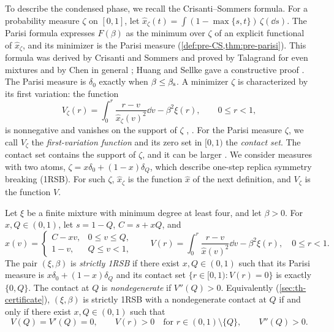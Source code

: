 To describe the condensed phase, we recall the Crisanti--Sommers formula. For a probability measure $\zeta$ on $[0,1]$, let $\hat x_\zeta(t)=\int(1-\max\{s,t\})\,\zeta(\dd s)$. The Parisi formula expresses $F(\beta)$ as the minimum over $\zeta$ of an explicit functional of $\hat x_\zeta$, and its minimizer is the Parisi measure (\cref{def:pre-CS,thm:pre-parisi}). This formula was derived by Crisanti and Sommers \cite{CrisantiSommers1992} and proved by Talagrand for even mixtures \cite[Theorem~1.1]{Talagrand2006} and by Chen in general \cite[Theorem~1]{Chen2013}; Huang and Sellke gave a constructive proof \cite{HuangSellke2024}. The Parisi measure is $\delta_0$ exactly when $\beta\le\beta_{\mathrm s}$. A minimizer $\zeta$ is characterized by its first variation: the function
\begin{equation*}
V_\zeta(r)=\int_0^r\frac{r-v}{\hat x_\zeta(v)^2}\dd v-\beta^2\xi(r),\qquad0\le r<1,
\end{equation*}
is nonnegative and vanishes on the support of $\zeta$ \cite[Proposition~2.1]{Talagrand2006}, \cite[Lemma~1.2]{HuangSellke2024}. For the Parisi measure $\zeta$, we call $V_\zeta$ the \emph{first-variation function} and its zero set in $[0,1)$ the \emph{contact set}. The contact set contains the support of $\zeta$, and it can be larger \cite[Remark~1.4]{HuangSellke2024}. We consider measures with two atoms, $\zeta=x\delta_0+(1-x)\delta_Q$, which describe one-step replica symmetry breaking (1RSB). For such $\zeta$, $\hat x_\zeta$ is the function $\hat x$ of the next definition, and $V_\zeta$ is the function $V$.

\begin{definition}\label{def:intro-certificate}
Let $\xi$ be a finite mixture with minimum degree at least four, and let $\beta>0$. For $x,Q\in(0,1)$, let $s=1-Q$, $C=s+xQ$, and
\begin{equation*}
\hat x(v)=\begin{cases}C-xv,&0\le v\le Q,\\1-v,&Q\le v<1,\end{cases}
\qquad
V(r)=\int_0^r\frac{r-v}{\hat x(v)^2}\dd v-\beta^2\xi(r),\quad0\le r<1.
\end{equation*}
The pair $(\xi,\beta)$ is \emph{strictly 1RSB} if there exist $x,Q\in(0,1)$ such that its Parisi measure is $x\delta_0+(1-x)\delta_Q$ and its contact set $\{r\in[0,1):V(r)=0\}$ is exactly $\{0,Q\}$. The contact at $Q$ is \emph{nondegenerate} if $V''(Q)>0$. Equivalently (\cref{sec:th-certificate}), $(\xi,\beta)$ is strictly 1RSB with a nondegenerate contact at $Q$ if and only if there exist $x,Q\in(0,1)$ such that
\begin{equation}\label{eq:intro-certificate}
V(Q)=V'(Q)=0,\qquad V(r)>0\quad\text{for }r\in(0,1)\setminus\{Q\},\qquad V''(Q)>0.
\end{equation}
\end{definition}

